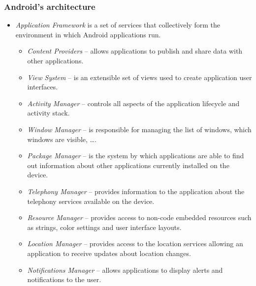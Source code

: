 \documentclass[10pt,xcolor=pdflatex]{beamer}
\begin{document}
\begin{frame}\frametitle{Android's architecture}
	\begin{itemize}
        \item \emph{Application Framework} is a set of services that collectively form the environment in which Android applications run.
          \begin{itemize}
            \item {\footnotesize \emph{Content Providers} -- allows applications to publish and share data with other applications}.
            \item {\footnotesize \emph{View System} -- is an extensible set of views used to create application user interfaces}.
            \item {\footnotesize \emph{Activity Manager} -- controls all aspects of the application lifecycle and activity stack}.
            \item {\footnotesize \emph{Window Manager} -- is responsible for managing the list of windows, which windows are visible, \ldots}.
            \item {\footnotesize \emph{Package Manager} -- is the system by which applications are able to find out information about other applications currently installed on the device}.
            \item {\footnotesize \emph{Telephony Manager} -- provides information to the application about the telephony services available on the device}.
            \item {\footnotesize \emph{Resource Manager} -- provides access to non-code embedded resources such as strings, color settings and user interface layouts}.
            \item {\footnotesize \emph{Location Manager} -- provides access to the location services allowing an application to receive updates about location changes}.
            \item {\footnotesize \emph{Notifications Manager} -- allows applications to display alerts and notifications to the user}.
          \end{itemize}
	\end{itemize}
\end{frame}
\end{document}
